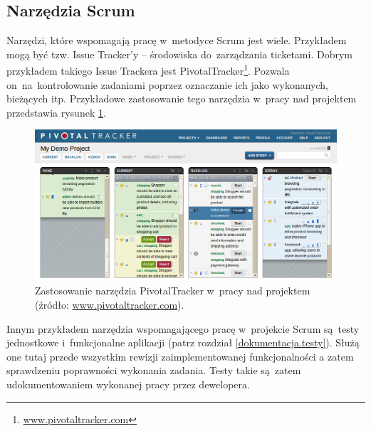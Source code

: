 \subsection{Narzędzia Scrum} \label{scrum.narzedzia}

Narzędzi, które wspomagają pracę w~metodyce Scrum jest wiele. Przykładem mogą być tzw. Issue Tracker'y -- środowiska do~zarządzania ticketami. Dobrym przykładem takiego Issue Trackera jest PivotalTracker\footnote{\url{www.pivotaltracker.com}}. Pozwala on~na~kontrolowanie zadaniami poprzez oznaczanie ich jako wykonanych, bieżących itp. Przykładowe zastosowanie tego narzędzia w~pracy nad projektem przedstawia rysunek \ref{fig.rysunek.pivotal}.

\begin{figure}[!t]
\centering
\includegraphics[width=\textwidth]{obrazki/pivotal.png}
\caption{Zastosowanie narzędzia PivotalTracker w~pracy nad projektem (źródło: \url{www.pivotaltracker.com}).}
\label{fig.rysunek.pivotal}
\end{figure}

Innym przykładem narzędzia wspomagającego pracę w~projekcie Scrum są~testy jednostkowe i~funkcjonalne aplikacji (patrz rozdział \ref{dokumentacja.testy}). Służą one tutaj przede wszystkim rewizji zaimplementowanej funkcjonalności a zatem sprawdzeniu poprawności wykonania zadania. Testy takie są~zatem udokumentowaniem wykonanej pracy przez dewelopera.
